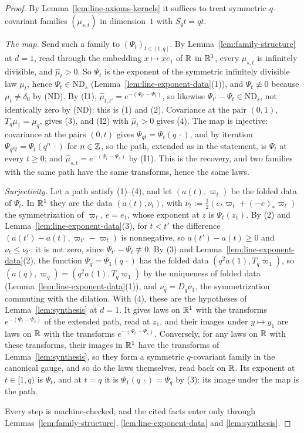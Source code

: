 \begin{proof}
By Lemma~\ref{lem:line-axioms-kernels} it suffices to treat symmetric $q$-covariant families
$(\mu_{s,t})$ in dimension~$1$ with $S_qt = qt$.

\emph{The map.} Send such a family to $(\Psi_t)_{t \in [1,q]}$. By
Lemma~\ref{lem:family-structure} at $d = 1$, read through the embedding $x \mapsto xe_1$ of $\mathbb{R}$
in $\mathbb{R}^1$, every $\mu_{s,t}$ is infinitely divisible, and $\widehat\mu_t > 0$. So $\Psi_t$ is the
exponent of the symmetric infinitely divisible law $\mu_t$, hence $\Psi_t \in \mathrm{ND}_s$
(Lemma~\ref{lem:line-exponent-data}(1)), and $\Psi_t \not\equiv 0$ because $\mu_t \ne \delta_0$
by (ND). By (I1), $\widehat\mu_{t,t'} = e^{-(\Psi_{t'} - \Psi_t)}$, so likewise
$\Psi_{t'} - \Psi_t \in \mathrm{ND}_s$, not identically zero by (ND): this is (1) and (2).
Covariance at the pair $(0, 1)$, $T_q\mu_1 = \mu_q$, gives (3), and (I2) with
$\widehat\mu_t > 0$ gives (4). The map is injective: covariance at the pairs $(0, t)$ gives
$\Psi_{qt} = \Psi_t(q\,\cdot)$, and by iteration $\Psi_{q^nt} = \Psi_t(q^n\,\cdot)$ for
$n \in \mathbb{Z}$, so the path, extended as in the statement, is $\Psi_t$ at every $t \ge 0$; and
$\widehat\mu_{s,t} = e^{-(\Psi_t - \Psi_s)}$ by (I1). This is the recovery, and two families
with the same path have the same transforms, hence the same laws.

\emph{Surjectivity.} Let a path satisfy (1)--(4), and let $(a(t), \varpi_t)$ be the folded data of
$\Psi_t$. In $\mathbb{R}^1$ they are the \Levy{} data $(a(t), \nu_t)$, with
$\nu_t := \tfrac12(e_*\varpi_t + (-e)_*\varpi_t)$ the symmetrization of $\varpi_t$, $e = e_1$,
whose exponent at $z$ is $\Psi_t(z_1)$. By (2) and Lemma~\ref{lem:line-exponent-data}(3), for
$t < t'$ the difference $(a(t') - a(t), \varpi_{t'} - \varpi_t)$ is nonnegative, so
$a(t') - a(t) \ge 0$ and $\nu_t \le \nu_{t'}$; it is not zero, since
$\Psi_{t'} - \Psi_t \not\equiv 0$. By (3) and Lemma~\ref{lem:line-exponent-data}(2), the
function $\Psi_q = \Psi_1(q\,\cdot)$ has the folded data $(q^2a(1), T_q\varpi_1)$, so
$(a(q), \varpi_q) = (q^2a(1), T_q\varpi_1)$ by the uniqueness of folded data
(Lemma~\ref{lem:line-exponent-data}(1)), and $\nu_q = D_q\nu_1$, the symmetrization commuting
with the dilation. With (4), these are the hypotheses of Lemma~\ref{lem:synthesis} at $d = 1$.
It gives laws on $\mathbb{R}^1$ with the transforms $e^{-(\Psi_t - \Psi_s)}$ of the extended path, read
at $z_1$, and their images under $y \mapsto y_1$ are laws on $\mathbb{R}$ with the transforms
$e^{-(\Psi_t - \Psi_s)}$. Conversely, for any laws on $\mathbb{R}$ with these transforms, their images
in $\mathbb{R}^1$ have the transforms of Lemma~\ref{lem:synthesis}, so they form a symmetric $q$-covariant
family in the canonical gauge, and so do the laws themselves, read back on $\mathbb{R}$. Its exponent at
$t \in [1, q)$ is $\Psi_t$, and at $t = q$ it is $\Psi_1(q\,\cdot) = \Psi_q$ by (3): its image under
the map is the path.

Every step is machine-checked, and the cited facts enter only through
Lemmas~\ref{lem:family-structure}, \ref{lem:line-exponent-data} and \ref{lem:synthesis}.
\end{proof}

